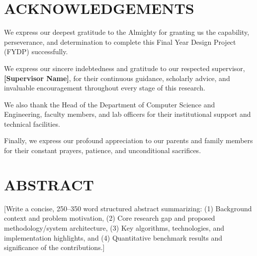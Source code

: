 \cleardoublepage
\section*{ACKNOWLEDGEMENTS}

We express our deepest gratitude to the Almighty for granting us the capability, perseverance, and determination to complete this Final Year Design Project (FYDP) successfully.

We express our sincere indebtedness and gratitude to our respected supervisor, \textbf{[Supervisor Name]}, for their continuous guidance, scholarly advice, and invaluable encouragement throughout every stage of this research.

We also thank the Head of the Department of Computer Science and Engineering, faculty members, and lab officers for their institutional support and technical facilities.

Finally, we express our profound appreciation to our parents and family members for their constant prayers, patience, and unconditional sacrifices.

\cleardoublepage
\section*{ABSTRACT}

[Write a concise, 250--350 word structured abstract summarizing: (1) Background context and problem motivation, (2) Core research gap and proposed methodology/system architecture, (3) Key algorithms, technologies, and implementation highlights, and (4) Quantitative benchmark results and significance of the contributions.]

\cleardoublepage
\tableofcontents

\cleardoublepage
\listoffigures

\cleardoublepage
\listoftables
